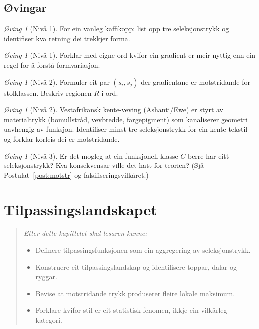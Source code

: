 \documentclass[10pt]{book}
\theoremstyle{definition}
\theoremstyle{plain}
\theoremstyle{remark}
\newtheorem{exercise}[definisjon]{\O{}ving}
\begin{document}
\section{\O vingar}

\begin{exercise}[Niv\aa{} 1]\label{ex:2.1}
For ein vanleg kaffikopp: list opp tre seleksjonstrykk og identifiser kva retning dei trekkjer forma.
\end{exercise}

\begin{exercise}[Niv\aa{} 1]\label{ex:2.2}
Forklar med eigne ord kvifor ein gradient er meir nyttig enn ein regel for \aa{} forst\aa{} formvariasjon.
\end{exercise}

\begin{exercise}[Niv\aa{} 2]\label{ex:2.3}
Formuler eit par $(s_i, s_j)$ der gradientane er motstridande for stolklassen. Beskriv regionen $R$ i ord.
\end{exercise}

\begin{exercise}[Niv\aa{} 2]\label{ex:2.4}
Vestafrikansk kente-veving (Ashanti/Ewe) er styrt av materialtrykk (bomullstr\aa d, vevbredde, fargepigment) som kanaliserer geometri uavhengig av funksjon. Identifiser minst tre seleksjonstrykk for ein kente-tekstil og forklar korleis dei er motstridande.
\end{exercise}

\begin{exercise}[Niv\aa{} 3]\label{ex:2.5}
Er det mogleg at ein funksjonell klasse $C$ berre har eitt seleksjonstrykk? Kva konsekvensar ville det hatt for teorien? (Sj\aa{} Postulat~\ref{post:motstr} og falsifiseringsvilk\aa ret.)
\end{exercise}


\chapter{Tilpassingslandskapet}\label{kap:landskap}

\begin{quote}\itshape
Etter dette kapittelet skal lesaren kunne:
\begin{itemize}[nosep]
\item Definere tilpassingsfunksjonen som ein aggregering av seleksjonstrykk.
\item Konstruere eit tilpassingslandskap og identifisere toppar, dalar og ryggar.
\item Bevise at motstridande trykk produserer fleire lokale maksimum.
\item Forklare kvifor stil er eit statistisk fenomen, ikkje ein vilk\aa rleg kategori.
\end{itemize}
\end{quote}
\end{document}
